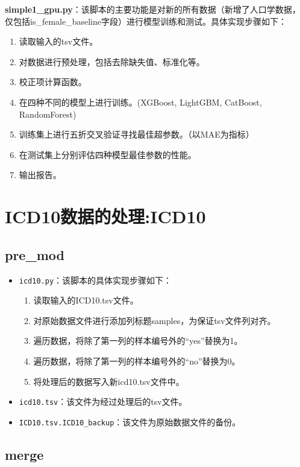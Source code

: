 \documentclass[UTF8]{report}
\theoremstyle{MyLineTheoremStyle} %
\theoremstyle{MyBlockTheoremStyle} %
\theoremstyle{MySubsubsectionStyle} %
\begin{document}
\textbf{simple1\_gpu.py}：该脚本的主要功能是对新的所有数据（新增了人口学数据，仅包括is\_female\_baseline字段）进行模型训练和测试。具体实现步骤如下：
\begin{enumerate}
    \item 读取输入的tsv文件。
    \item 对数据进行预处理，包括去除缺失值、标准化等。
    \item 校正项计算函数。
    \item 在四种不同的模型上进行训练。(XGBoost, LightGBM, CatBoost, RandomForest)
    \item 训练集上进行五折交叉验证寻找最佳超参数。（以MAE为指标）
    \item 在测试集上分别评估四种模型最佳参数的性能。
    \item 输出报告。
\end{enumerate}

\section{ICD10数据的处理:ICD10}

\subsection*{pre\_mod}

\begin{itemize}
    \item \texttt{icd10.py}：该脚本的具体实现步骤如下：
    \begin{enumerate}
        \item 读取输入的ICD10.tsv文件。
        \item 对原始数据文件进行添加列标题samples，为保证tsv文件列对齐。
        \item 遍历数据，将除了第一列的样本编号外的“yes”替换为1。
        \item 遍历数据，将除了第一列的样本编号外的“no”替换为0。
        \item 将处理后的数据写入新icd10.tsv文件中。
    \end{enumerate}
    \item \texttt{icd10.tsv}：该文件为经过处理后的tsv文件。
    \item \texttt{ICD10.tsv.ICD10\_backup}：该文件为原始数据文件的备份。
\end{itemize}


\subsection*{merge}
\end{document}
